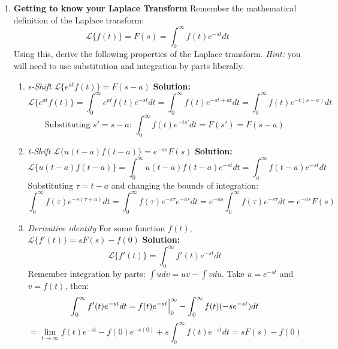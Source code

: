 \documentclass[letterpaper, fontsize=11pt]{scrartcl} %
\numberwithin{equation}{section} %
\numberwithin{figure}{section} %
\numberwithin{table}{section} %
\begin{document}
\begin{enumerate}
\item \textbf{Getting to know your Laplace Transform} \newline Remember the mathematical definition of the Laplace transform:
$$ \mathcal{L}\{f(t)\} = F(s) = \int_0^\infty f(t)e^{-st}dt$$
Using this, derive the following properties of the Laplace transform. \textit{Hint:} you will need to use substitution and integration by parts liberally.
\begin{enumerate}

\item \textit{s-Shift} $ \mathcal{L}\{e^{at}f(t)\} = F(s-a)$ \newline
\textbf{Solution:} 
$$\mathcal{L}\{e^{at}f(t)\} = \int_0^\infty e^{at}f(t)e^{-st}dt = \int_0^\infty f(t)e^{-st+at}dt = \int_0^\infty f(t)e^{-t(s-a)}dt$$
$$\text{Substituting $s' = s-a$: } \int_0^\infty f(t)e^{-ts'}dt = F(s') = F(s-a)$$

\item \textit{t-Shift} $ \mathcal{L}\{u(t-a)f(t-a)\} = e^{-as}F(s)$ \newline
\textbf{Solution:}
$$\mathcal{L}\{u(t-a)f(t-a)\} = \int_0^\infty u(t-a)f(t-a)e^{-st}dt = \int_a^\infty f(t-a)e^{-st}dt$$
Substituting $\tau = t-a$ and changing the bounds of integration:
$$\int_0^\infty f(\tau)e^{-s(\tau+a)}dt = \int_0^\infty f(\tau)e^{-s\tau}e^{-as}dt = e^{-as}\int_0^\infty f(\tau)e^{-s\tau}dt = e^{-as}F(s)$$

\item \textit{Derivative identity} For some function $f(t)$, $ \mathcal{L}\{f'(t)\} = sF(s) - f(0)$ \newline
\textbf{Solution:}
$$\mathcal{L}\{f'(t)\} = \int_0^\infty f'(t)e^{-st}dt$$
Remember integration by parts: $\int udv = uv - \int vdu$. Take $u = e^{-st}$ and $v=f(t)$, then:
$$ \int_0^\infty f'(t)e^{-st}dt = f(t)e^{-st}\Big{|}_0^\infty - \int_0^\infty f(t)(-se^{-st})dt$$ 
$$= \lim_{t\to\infty} f(t)e^{-st} - f(0)e^{-s(0)} + s\int_0^\infty f(t)e^{-st}dt = sF(s) - f(0)$$

\end{enumerate}


\end{enumerate}
\end{document}
